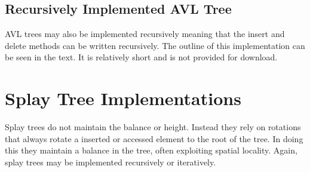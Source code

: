 \documentclass[letterpaper,10pt,english]{sphinxmanual}
\begin{document}
\begin{sphinxVerbatim}[commandchars=\\\{\},numbers=left,firstnumber=1,stepnumber=1]
        
     

        
     

    




\end{sphinxVerbatim}


\subsection{Recursively Implemented AVL Tree}
\label{\detokenize{chap9/chap9:recursively-implemented-avl-tree}}
AVL trees may also be implemented recursively meaning that the insert and delete methods can be written recursively. The outline of this implementation can be seen in the text. It is relatively short and is not provided for download.


\section{Splay Tree Implementations}
\label{\detokenize{chap9/chap9:splay-tree-implementations}}
Splay trees do not maintain the balance or height. Instead they rely on rotations that always rotate a inserted or accessed element to the root of the tree. In doing this they maintain a balance in the tree, often exploiting spatial locality. Again, splay trees may be implemented recursively or iteratively.
\end{document}
